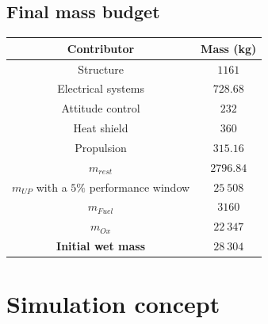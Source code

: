 \subsection{Final mass budget}
\begin{center}
	\begin{tabular}[H]{|c|c|}
		\hline
		\cellcolor{gray!50}Contributor & \cellcolor{gray!50}Mass (kg)\\
		\hline
		Structure & $1161$\\
		\hline
		Electrical systems & $728.68$\\
		\hline
		Attitude control & $232$\\
		\hline
		Heat shield & $360$\\
		\hline
		Propulsion & $315.16$\\
		\hline
		\cellcolor{green!30}\textbf{$m_{rest}$} & \textbf{$2796.84$}\\
		\hline
		\cellcolor{green!30}\textbf{$m_{UP}$} with a $5\%$ performance window & \textbf{$25\ 508$}\\
		\hline
		\cellcolor{green!30}\textbf{$m_{Fuel}$}  & \textbf{$3160$}\\
		\hline
		\cellcolor{green!30}\textbf{$m_{Ox}$}  & \textbf{$22\ 347$}\\
		\hline
		\cellcolor{red!30}\textbf{Initial wet mass}  & \textbf{$28\ 304$}\\
		\hline
	\end{tabular}
\end{center}
\section{Simulation concept}
